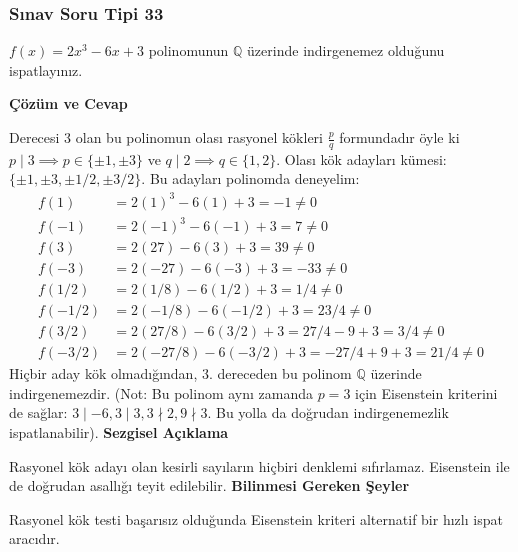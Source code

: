 \documentclass[11pt, a4paper]{article}
\newenvironment{cozum}{
    \vspace{0.5cm}
    \noindent\textcolor{green!60!black}{\faCheckCircle\enspace \textbf{\Large Çözüm ve Cevap}}\par\vspace{0.2cm}
}{}
\newenvironment{sezgisel}{
    \vspace{0.5cm}
    \noindent\textcolor{orange!80!black}{\faLightbulb\enspace \textbf{\Large Sezgisel Açıklama}}\par\vspace{0.2cm}
    \itshape
}{}
\newenvironment{bilgi}{
    \vspace{0.5cm}
    \noindent\textcolor{red!70!black}{\faExclamationTriangle\enspace \textbf{\Large Bilinmesi Gereken Şeyler}}\par\vspace{0.2cm}
}{}
\begin{document}
\subsubsection{Sınav Soru Tipi 33}
\begin{sinavbox}
$f(x) = 2x^3-6x+3$ polinomunun $\mathbb{Q}$ üzerinde indirgenemez olduğunu ispatlayınız.
\end{sinavbox}
\begin{cozum}
Derecesi 3 olan bu polinomun olası rasyonel kökleri $\frac{p}{q}$ formundadır öyle ki $p \mid 3 \implies p \in \{\pm 1, \pm 3\}$ ve $q \mid 2 \implies q \in \{1, 2\}$.
Olası kök adayları kümesi: $\{\pm 1, \pm 3, \pm 1/2, \pm 3/2\}$.
Bu adayları polinomda deneyelim:
\begin{align*}
f(1) &= 2(1)^3 - 6(1) + 3 = -1 \neq 0 \\
f(-1) &= 2(-1)^3 - 6(-1) + 3 = 7 \neq 0 \\
f(3) &= 2(27) - 6(3) + 3 = 39 \neq 0 \\
f(-3) &= 2(-27) - 6(-3) + 3 = -33 \neq 0 \\
f(1/2) &= 2(1/8) - 6(1/2) + 3 = 1/4 \neq 0 \\
f(-1/2) &= 2(-1/8) - 6(-1/2) + 3 = 23/4 \neq 0 \\
f(3/2) &= 2(27/8) - 6(3/2) + 3 = 27/4 - 9 + 3 = 3/4 \neq 0 \\
f(-3/2) &= 2(-27/8) - 6(-3/2) + 3 = -27/4 + 9 + 3 = 21/4 \neq 0
\end{align*}
Hiçbir aday kök olmadığından, 3. dereceden bu polinom $\mathbb{Q}$ üzerinde indirgenemezdir.
(Not: Bu polinom aynı zamanda $p=3$ için Eisenstein kriterini de sağlar: $3 \mid -6, 3 \mid 3, 3 \nmid 2, 9 \nmid 3$. Bu yolla da doğrudan indirgenemezlik ispatlanabilir).
\end{cozum}
\begin{sezgisel}
Rasyonel kök adayı olan kesirli sayıların hiçbiri denklemi sıfırlamaz. Eisenstein ile de doğrudan asallığı teyit edilebilir.
\end{sezgisel}
\begin{bilgi}
Rasyonel kök testi başarısız olduğunda Eisenstein kriteri alternatif bir hızlı ispat aracıdır.
\end{bilgi}

\newpage
\end{document}
